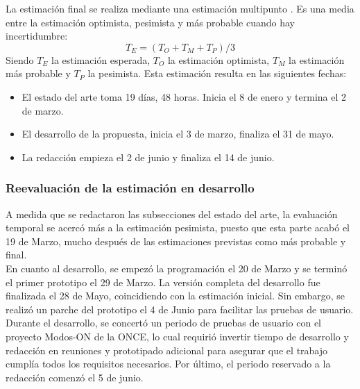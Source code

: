 La estimación final se realiza mediante una estimación multipunto \cite{projectmanagementinstituteGuideProjectManagement2017}. Es una media entre la estimación optimista, pesimista y más probable cuando hay incertidumbre:
\[
	T_E = (T_O + T_M + T_P)/3
\]
Siendo $T_E$ la estimación esperada, $T_O$ la estimación optimista, $T_M$ la estimación más probable y $T_P$ la pesimista.
Esta estimación resulta en las siguientes fechas:
\begin{itemize}
	\item El estado del arte toma 19 días, 48 horas. Inicia el 8 de enero y termina el 2 de marzo.
	\item El desarrollo de la propuesta, inicia el 3 de marzo, finaliza el 31 de mayo. 
	\item La redacción empieza el 2 de junio y finaliza el 14 de junio.
\end{itemize}
\subsubsection{Reevaluación de la estimación en desarrollo}
A medida que se redactaron las subsecciones del estado del arte, la evaluación temporal se acercó más a la estimación pesimista, puesto que esta parte acabó el 19 de Marzo, mucho después de las estimaciones previstas como más probable y final. \\

En cuanto al desarrollo, se empezó la programación el 20 de Marzo y se terminó el primer prototipo el 29 de Marzo. La versión completa del desarrollo fue finalizada el 28 de Mayo, coincidiendo con la estimación inicial. Sin embargo, se realizó un parche del prototipo el 4 de Junio para facilitar las pruebas de usuario.\\

Durante el desarrollo, se concertó un periodo de pruebas de usuario con el proyecto Modos-ON de la ONCE, lo cual requirió invertir tiempo de desarrollo y redacción en reuniones y prototipado adicional para asegurar que el trabajo cumplía todos los requisitos necesarios. Por último, el periodo reservado a la redacción comenzó el 5 de junio. \\

